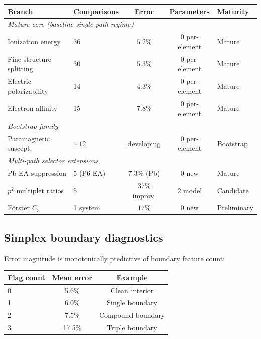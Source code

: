 \documentclass[11pt,a4paper]{article}
\begin{document}
\begin{center}
\renewcommand{\arraystretch}{1.15}
\begin{tabular}{llccl}
\toprule
Branch & Comparisons & Error & Parameters & Maturity \\
\midrule
\multicolumn{5}{l}{\emph{Mature core (baseline single-path regime)}} \\
Ionization energy & 36 & $5.2\%$ & 0 per-element & Mature \\
Fine-structure splitting & 30 & $5.3\%$ & 0 per-element & Mature \\
Electric polarizability & 14 & $4.3\%$ & 0 per-element & Mature \\
Electron affinity & 15 & $7.8\%$ & 0 per-element & Mature \\
\midrule
\multicolumn{5}{l}{\emph{Bootstrap family}} \\
Paramagnetic suscept. & $\sim 12$ & developing & 0 per-element & Bootstrap \\
\midrule
\multicolumn{5}{l}{\emph{Multi-path selector extensions}} \\
Pb EA suppression & 5 (P6 EA) & $7.3\%$ (Pb) & 0 new & Mature \\
$p^2$ multiplet ratios & 5 & 37\% improv. & 2 model & Candidate \\
F\"orster $C_3$ & 1 system & $17\%$ & 0 new & Preliminary \\
\bottomrule
\end{tabular}
\end{center}

\subsection{Simplex boundary diagnostics}
\label{sec:boundaries}

Error magnitude is monotonically predictive of boundary feature count:

\begin{center}
\begin{tabular}{lcc}
\toprule
Flag count & Mean error & Example \\
\midrule
0 & 5.6\% & Clean interior \\
1 & 6.0\% & Single boundary \\
2 & 7.5\% & Compound boundary \\
3 & 17.5\% & Triple boundary \\
\bottomrule
\end{tabular}
\end{center}
\end{document}
